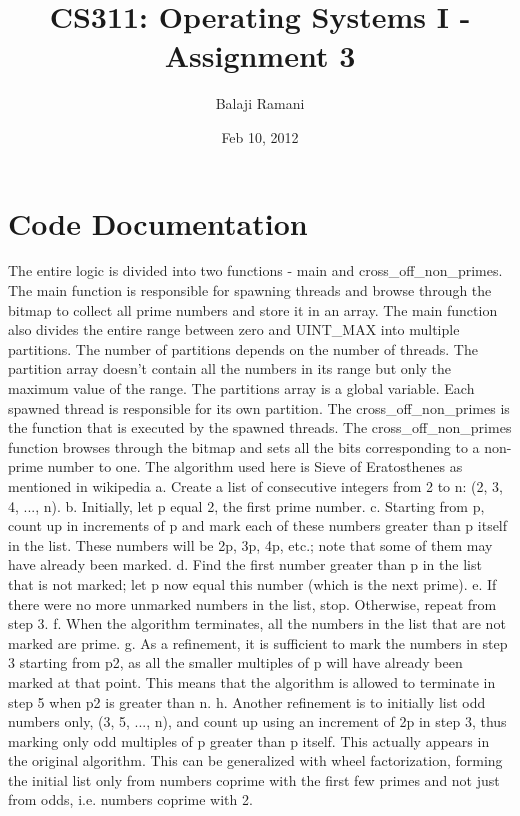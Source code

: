 \documentclass[letterpaper,10pt,twocolumn,titlepage]{article}
\begin{document}
\title{CS311: Operating Systems I - Assignment 3}
\author{Balaji Ramani}
\date{Feb 10, 2012}
\maketitle


\section{Code Documentation}
	The entire logic is divided into two functions - main and cross\_off\_non\_primes.\newline
The main function is responsible for spawning threads and browse through the bitmap to collect all prime numbers and store it in an array. The main function also divides the entire range between zero and UINT\_MAX into multiple partitions. The number of partitions depends on the number of threads. The partition array doesn't contain all the numbers in its range but only the maximum value of the range. The partitions array is a global variable. Each spawned thread is responsible for its own partition.\newline
	The cross\_off\_non\_primes is the function that is executed by the spawned threads. The cross\_off\_non\_primes function browses through the bitmap and sets all the bits corresponding to a non-prime number to one.\newline
	The algorithm used here is Sieve of Eratosthenes as mentioned in wikipedia\newline
		a. Create a list of consecutive integers from 2 to n: (2, 3, 4, ..., n).\newline
		b. Initially, let p equal 2, the first prime number.\newline
		c. Starting from p, count up in increments of p and mark each of these numbers greater than p itself in the list. These numbers will be 2p, 3p, 4p, etc.; note that some of them may have already been marked.\newline
		d. Find the first number greater than p in the list that is not marked; let p now equal this number (which is the next prime).\newline
		e. If there were no more unmarked numbers in the list, stop. Otherwise, repeat from step 3.\newline
		f. When the algorithm terminates, all the numbers in the list that are not marked are prime.\newline
		g. As a refinement, it is sufficient to mark the numbers in step 3 starting from p2, as all the smaller multiples of p will have already been marked at that point. This means that the algorithm is allowed to terminate in step 5 when p2 is greater than n.\newline
		h. Another refinement is to initially list odd numbers only, (3, 5, ..., n), and count up using an increment of 2p in step 3, thus marking only odd multiples of p greater than p itself. This actually appears in the original algorithm. This can be generalized with wheel factorization, forming the initial list only from numbers coprime with the first few primes and not just from odds, i.e. numbers coprime with 2.\newline
\end{document}
